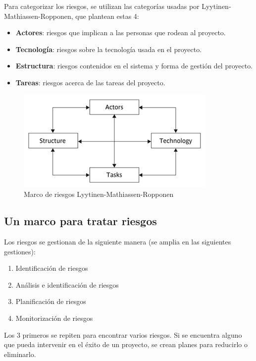 \documentclass[12pt]{article}
\begin{document}
{Para categorizar los riesgos, se utilizan las categorías usadas por Lyytinen-Mathiassen-Ropponen, que plantean estas 4:}

\begin{itemize}
    \item {\textbf{Actores}: riesgos que implican a las personas que rodean al proyecto.}
    \item {\textbf{Tecnología}: riesgos sobre la tecnología usada en el proyecto.}
    \item {\textbf{Estructura}: riesgos contenidos en el sistema y forma de gestión del proyecto.}
    \item {\textbf{Tareas}: riesgos acerca de las tareas del proyecto.}
\end{itemize}

\begin{figure} [ht]
    \centering
    \includegraphics[keepaspectratio=true, scale=1.25]{images/Lyytinen-Mathiassen-Ropponen.png}
    \caption{Marco de riesgos Lyytinen-Mathiassen-Ropponen}
    \label{fig:7.1}
\end{figure}

\subsection{Un marco para tratar riesgos}
\label{7.4.0}

{Los riesgos se gestionan de la siguiente manera (se amplia en las siguientes gestiones):}

\begin{enumerate}
    \item {Identificación de riesgos}
    \item {Análisis e identificación de riesgos}
    \item {Planificación de riesgos}
    \item {Monitorización de riesgos}
\end{enumerate}

{Los 3 primeros se repiten para encontrar varios riesgos. Si se encuentra alguno que pueda intervenir en el éxito de un proyecto, se crean planes para reducirlo o eliminarlo.} \\
\end{document}
